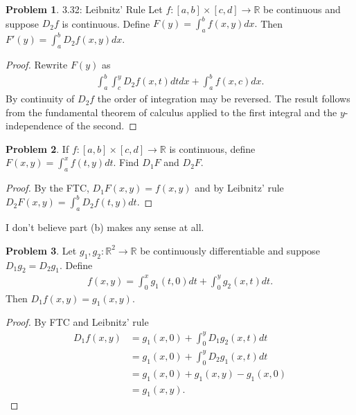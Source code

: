 \documentclass[20pt]{article}
\theoremstyle{plain}
\theoremstyle{definition}
\newtheorem*{problem}{Problem}
\newcommand{\reals}{\mathbb{R}}
\begin{document}
\begin{problem}{3.32: Leibnitz' Rule}
  Let $f: [a, b] \times [c, d] \to \reals$ be continuous and suppose
  $D_2f$ is continuous.  Define $F(y) = \int_a^bf(x, y)dx.$
  Then $F'(y) = \int_a^bD_2f(x, y)dx.$
\end{problem}

\begin{proof}
  Rewrite $F(y)$ as
  \begin{align*}
    \int_a^b \int_c^y D_2f(x, t)dtdx + \int_a^b f(x, c) dx.
  \end{align*}
  By continuity of $D_2f$ the order of integration may be reversed.
  The result follows from the fundamental theorem of calculus applied to the
  first integral and the $y$-independence of the second.
\end{proof}


\begin{problem}{3.33}
  If $f:[a, b] \times [c, d] \to \reals$ is continuous, define
  $F(x, y) = \int_a^xf(t, y)dt.$ Find $D_1F$ and $D_2F$.
\end{problem}

\begin{proof}
  By the FTC, $D_1F(x, y) = f(x, y)$ and by Leibnitz' rule $D_2F(x, y) = \int_a^bD_2f(t, y)dt.$
\end{proof}
\color{Blue}
I don't believe part (b) makes any sense at all.
\color{Black}




\begin{problem}{3.34}
  Let $g_1, g_2: \reals^2 \to \reals$ be continuously differentiable and
  suppose $D_1g_2 = D_2g_1.$  Define
  \begin{align*}
    f(x, y) = \int_0^x g_1(t, 0)dt + \int_0^yg_2(x, t)dt.
  \end{align*}
  Then $D_1f(x, y) = g_1(x, y).$
\end{problem}

\begin{proof}
  By FTC and Leibnitz' rule
  \begin{align*}
    D_1f(x, y)
    &= g_1(x, 0) + \int_0^yD_1g_2(x, t)dt \\
    &= g_1(x, 0) + \int_0^yD_2g_1(x, t)dt \\
    &= g_1(x, 0) + g_1(x, y) - g_1(x, 0) \\
    &= g_1(x, y).
  \end{align*}
\end{proof}
\end{document}

